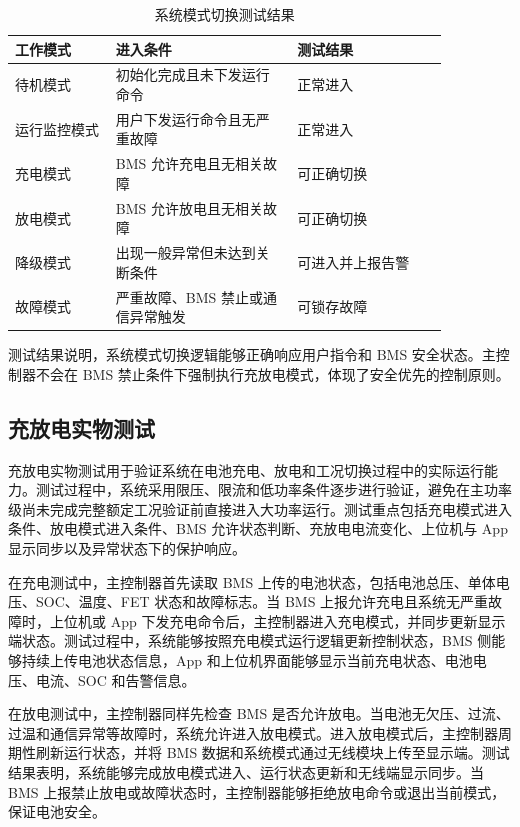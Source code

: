 \begin{table}[htbp]
  \centering
  \caption{系统模式切换测试结果}
  \label{tab:mode_switch_test}
  \renewcommand{\arraystretch}{1.2}
  \begin{tabular}{|m{0.20\linewidth}|m{0.36\linewidth}|m{0.30\linewidth}|}
    \hline
    \rule{0pt}{1.0cm}工作模式 & 进入条件 & 测试结果 \\
    \hline
    \rule{0pt}{1.0cm}待机模式 & 初始化完成且未下发运行命令 & 正常进入 \\
    \hline
    \rule{0pt}{1.0cm}运行监控模式 & 用户下发运行命令且无严重故障 & 正常进入 \\
    \hline
    \rule{0pt}{1.0cm}充电模式 & BMS 允许充电且无相关故障 & 可正确切换 \\
    \hline
    \rule{0pt}{1.0cm}放电模式 & BMS 允许放电且无相关故障 & 可正确切换 \\
    \hline
    \rule{0pt}{1.0cm}降级模式 & 出现一般异常但未达到关断条件 & 可进入并上报告警 \\
    \hline
    \rule{0pt}{1.0cm}故障模式 & 严重故障、BMS 禁止或通信异常触发 & 可锁存故障 \\
    \hline
  \end{tabular}
\end{table}

测试结果说明，系统模式切换逻辑能够正确响应用户指令和 BMS 安全状态。主控制器不会在 BMS 禁止条件下强制执行充放电模式，体现了安全优先的控制原则。

\subsection{充放电实物测试}

充放电实物测试用于验证系统在电池充电、放电和工况切换过程中的实际运行能力。测试过程中，系统采用限压、限流和低功率条件逐步进行验证，避免在主功率级尚未完成完整额定工况验证前直接进入大功率运行。测试重点包括充电模式进入条件、放电模式进入条件、BMS 允许状态判断、充放电电流变化、上位机与 App 显示同步以及异常状态下的保护响应。

在充电测试中，主控制器首先读取 BMS 上传的电池状态，包括电池总压、单体电压、SOC、温度、FET 状态和故障标志。当 BMS 上报允许充电且系统无严重故障时，上位机或 App 下发充电命令后，主控制器进入充电模式，并同步更新显示端状态。测试过程中，系统能够按照充电模式运行逻辑更新控制状态，BMS 侧能够持续上传电池状态信息，App 和上位机界面能够显示当前充电状态、电池电压、电流、SOC 和告警信息。

在放电测试中，主控制器同样先检查 BMS 是否允许放电。当电池无欠压、过流、过温和通信异常等故障时，系统允许进入放电模式。进入放电模式后，主控制器周期性刷新运行状态，并将 BMS 数据和系统模式通过无线模块上传至显示端。测试结果表明，系统能够完成放电模式进入、运行状态更新和无线端显示同步。当 BMS 上报禁止放电或故障状态时，主控制器能够拒绝放电命令或退出当前模式，保证电池安全。

